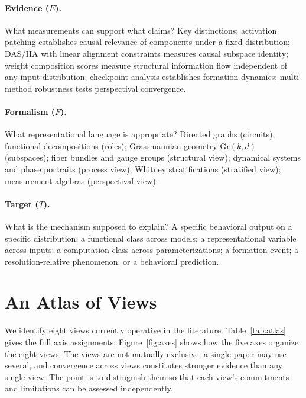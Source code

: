 \documentclass[11pt]{article}
\theoremstyle{remark}
\newcommand{\Gr}{\mathrm{Gr}}
\begin{document}
\paragraph{Evidence ($E$).}
What measurements can support what claims?  Key distinctions: activation
patching establishes causal relevance of components under a fixed
distribution; DAS/IIA with linear alignment constraints measures causal
subspace identity; weight composition scores measure structural
information flow independent of any input distribution; checkpoint
analysis establishes formation dynamics; multi-method robustness tests
perspectival convergence.

\paragraph{Formalism ($F$).}
What representational language is appropriate?  Directed graphs (circuits);
functional decompositions (roles); Grassmannian geometry $\Gr(k,d)$
(subspaces); fiber bundles and gauge groups (structural view); dynamical
systems and phase portraits (process view); Whitney stratifications
(stratified view); measurement algebras (perspectival view).

\paragraph{Target ($T$).}
What is the mechanism supposed to explain?  A specific behavioral output
on a specific distribution; a functional class across models; a
representational variable across inputs; a computation class across
parameterizations; a formation event; a resolution-relative phenomenon;
or a behavioral prediction.

\section{An Atlas of Views}\label{sec:atlas}

We identify eight views currently operative in the literature.  Table~\ref{tab:atlas}
gives the full axis assignments; Figure~\ref{fig:axes} shows how the five axes organize
the eight views.  The views are not mutually exclusive:
a single paper may use several, and convergence across views constitutes
stronger evidence than any single view.  The point is to distinguish
them so that each view's commitments and limitations can be assessed
independently.
\end{document}
